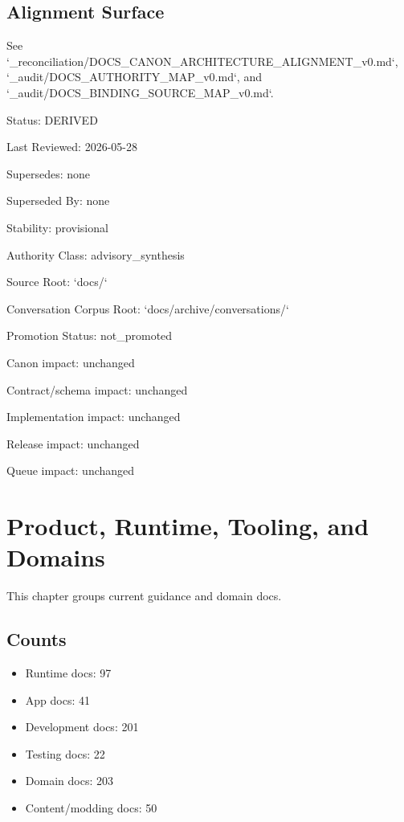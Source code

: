 \documentclass[11pt,a4paper]{report}
\begin{document}
\section{Alignment Surface}

See `\_reconciliation/\allowbreak{}DOCS\_CANON\_ARCHITECTURE\_ALIGNMENT\_v0.\allowbreak{}md`, `\_audit/\allowbreak{}DOCS\_AUTHORITY\_MAP\_v0.\allowbreak{}md`, and `\_audit/\allowbreak{}DOCS\_BINDING\_SOURCE\_MAP\_v0.\allowbreak{}md`.\allowbreak{}



Status: DERIVED

Last Reviewed: 2026-\allowbreak{}05-\allowbreak{}28

Supersedes: none

Superseded By: none

Stability: provisional

Authority Class: advisory\_synthesis

Source Root: `docs/\allowbreak{}`

Conversation Corpus Root: `docs/\allowbreak{}archive/\allowbreak{}conversations/\allowbreak{}`

Promotion Status: not\_promoted

Canon impact: unchanged

Contract/\allowbreak{}schema impact: unchanged

Implementation impact: unchanged

Release impact: unchanged

Queue impact: unchanged


\chapter{Product, Runtime, Tooling, and Domains}

This chapter groups current guidance and domain docs.\allowbreak{}


\section{Counts}

\begin{itemize}
\item Runtime docs: 97
\item App docs: 41
\item Development docs: 201
\item Testing docs: 22
\item Domain docs: 203
\item Content/\allowbreak{}modding docs: 50
\end{itemize}
\end{document}
